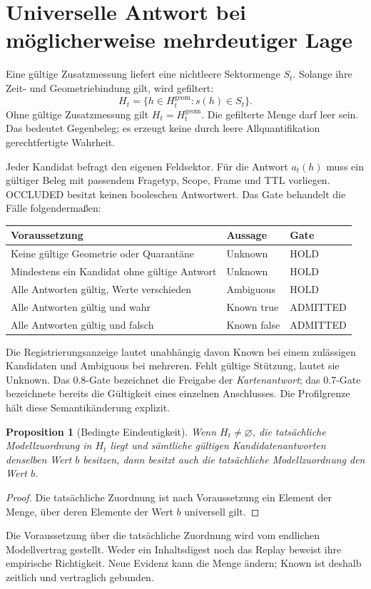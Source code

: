 \documentclass[11pt,a4paper]{article}
\newcommand{\nextsection}[2]{\clearpage{\color{accent}\small\textsf{#1}}\section{#2}}
\newtheorem{proposition}{Proposition}[section]
\begin{document}
\nextsection{47 / BESTIMMTHEIT}{Universelle Antwort bei möglicherweise mehrdeutiger Lage}
Eine gültige Zusatzmessung liefert eine nichtleere Sektormenge $S_t$.
Solange ihre Zeit- und Geometriebindung gilt, wird gefiltert:
\[
 H_t=\{h\in H_t^{\mathrm{geom}}:s(h)\in S_t\}.
\]
Ohne gültige Zusatzmessung gilt $H_t=H_t^{\mathrm{geom}}$.
Die gefilterte Menge darf leer sein. Das bedeutet Gegenbeleg;
es erzeugt keine durch leere Allquantifikation gerechtfertigte Wahrheit.

Jeder Kandidat befragt den eigenen Feldsektor. Für die
Antwort $a_t(h)$ muss ein gültiger Beleg mit passendem Fragetyp,
Scope, Frame und TTL vorliegen. OCCLUDED besitzt keinen booleschen
Antwortwert. Das Gate behandelt die Fälle folgendermaßen:

\begin{center}\begin{tabularx}{\linewidth}{@{}Yll@{}}\toprule
Voraussetzung & Aussage & Gate\\\midrule
Keine gültige Geometrie oder Quarantäne & Unknown & HOLD\\
Mindestens ein Kandidat ohne gültige Antwort & Unknown & HOLD\\
Alle Antworten gültig, Werte verschieden & Ambiguous & HOLD\\
Alle Antworten gültig und wahr & Known true & ADMITTED\\
Alle Antworten gültig und falsch & Known false & ADMITTED\\\bottomrule
\end{tabularx}\end{center}

Die Registrierungsanzeige lautet unabhängig davon Known bei einem
zulässigen Kandidaten und Ambiguous bei mehreren. Fehlt gültige
Stützung, lautet sie Unknown. Das 0.8-Gate bezeichnet die Freigabe
der \emph{Kartenantwort}; das 0.7-Gate bezeichnete bereits die
Gültigkeit eines einzelnen Anschlusses. Die Profilgrenze hält
diese Semantikänderung explizit.

\begin{proposition}[Bedingte Eindeutigkeit]
Wenn $H_t\ne\varnothing$, die tatsächliche Modellzuordnung in $H_t$
liegt und sämtliche gültigen Kandidatenantworten denselben Wert $b$
besitzen, dann besitzt auch die tatsächliche Modellzuordnung den Wert $b$.
\end{proposition}
\begin{proof}
Die tatsächliche Zuordnung ist nach Voraussetzung ein Element der
Menge, über deren Elemente der Wert $b$ universell gilt.
\end{proof}
Die Voraussetzung über die tatsächliche Zuordnung wird vom endlichen
Modellvertrag gestellt. Weder ein Inhaltsdigest noch das Replay
beweist ihre empirische Richtigkeit. Neue Evidenz kann die Menge
ändern; Known ist deshalb zeitlich und vertraglich gebunden.
\end{document}
